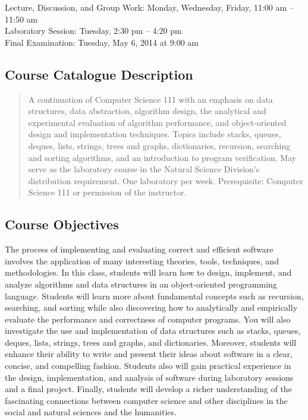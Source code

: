 Lecture, Discussion, and Group Work: Monday, Wednesday, Friday, 11:00 am -- 11:50 am\\
Laboratory Session: Tuesday, 2:30 pm -- 4:20 pm \\
Final Examination: Tuesday, May 6, 2014 at 9:00 am

\subsection*{Course Catalogue Description}

\begin{quote}

A continuation of Computer Science 111 with an emphasis on data structures, data abstraction, algorithm design, the
analytical and experimental evaluation of algorithm performance, and object-oriented design and implementation
techniques. Topics include stacks, queues, deques, lists, strings, trees and graphs, dictionaries, recursion, searching
and sorting algorithms, and an introduction to program verification. May serve as the laboratory course in the Natural
Science Division’s distribution requirement. One laboratory per week.  Prerequisite: Computer Science 111 or permission
of the instructor.

\end{quote}

\subsection*{Course Objectives}

The process of implementing and evaluating correct and efficient software involves the application of many interesting
theories, tools, techniques, and methodologies.  In this class, students will learn how to design, implement, and
analyze algorithms and data structures in an object-oriented programming language. Students will learn more about
fundamental concepts such as recursion, searching, and sorting while also discovering how to analytically and
empirically evaluate the performance and correctness of computer programs. You will also investigate the use and
implementation of data structures such as stacks, queues, deques, lists, strings, trees and graphs, and dictionaries.
Moreover, students will enhance their ability to write and present their ideas about software in a clear, concise, and
compelling fashion.  Students also will gain practical experience in the design, implementation, and analysis of
software during laboratory sessions and a final project. Finally, students will develop a richer understanding of the
fascinating connections between computer science and other disciplines in the social and natural sciences and the
humanities.

